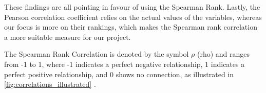 %      

These findings are all pointing in favour of using the Spearman Rank. Lastly, the Pearson correlation coefficient relies on the actual values of the variables, whereas our focus is more on their rankings, which makes the Spearman rank correlation a more suitable measure for our project.




The Spearman Rank Correlation is denoted by the symbol $\rho$ (rho) and ranges from -1 to 1, where -1 indicates a perfect negative relationship, 1 indicates a perfect positive relationship, and 0 shows no connection, as illustrated in \cref{fig:correlations_illustrated} \autocite{laerdstatistics}.  

